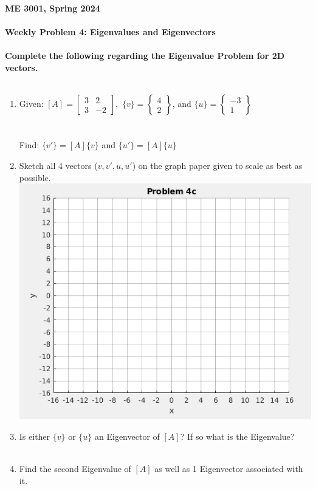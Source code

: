 \documentclass[11pt]{article}
\newcommand{\NUM}{4}
\begin{document}
	\textbf{\LARGE ME 3001, Spring 2024} \\\\
	\textbf{\LARGE Weekly Problem \NUM: Eigenvalues and Eigenvectors} \\\\
		
		\textbf{\large Complete the following regarding the Eigenvalue Problem for 2D vectors.}\\\\


              \begin{enumerate}

\item Given: $ [A]=\left[ \begin{array}{cc} 3 & 2  \\ 3 & -2   \end{array} \right], $ \hspace{10mm} $ \{v\}=\left\{ \begin{array}{c} 4 \\ 2   \end{array} \right\} $, and $ \{u\}=\left\{ \begin{array}{c} -3 \\ 1   \end{array} \right\} $ \\\\\\
Find:  $\{v'\}=[A]\{v\}$ and  $\{u'\}=[A]\{u\}$ \vspace{20mm}\\


\item Sketch all 4 vectors ($v,v',u,u'$) on the graph paper given to scale as best as possible.  \vspace{00mm}\\

\includegraphics[scale=.6]{exam1_prob4c.png}
\item Is either $\{v\}$ or $\{u\}$ an Eigenvector of $[A]$? If so what is the Eigenvalue?\\\\

\item Find the second Eigenvalue of $[A]$ as well as 1 Eigenvector associated with it.

\end{enumerate}		
\end{document}
